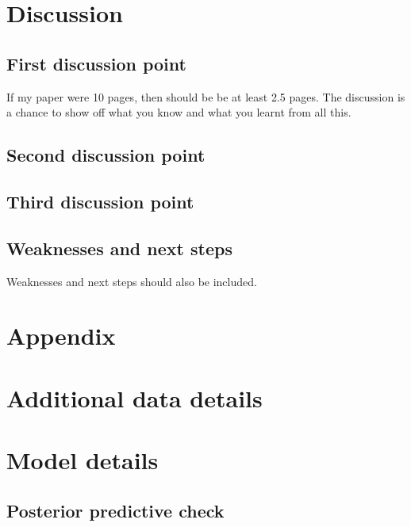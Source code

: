 \documentclass[
  letterpaper,
  DIV=11,
  numbers=noendperiod]{scrartcl}
\begin{document}
\section{Discussion}\label{discussion}

\subsection{First discussion point}\label{sec-first-point}

If my paper were 10 pages, then should be be at least 2.5 pages. The
discussion is a chance to show off what you know and what you learnt
from all this.

\subsection{Second discussion point}\label{second-discussion-point}

\subsection{Third discussion point}\label{third-discussion-point}

\subsection{Weaknesses and next steps}\label{weaknesses-and-next-steps}

Weaknesses and next steps should also be included.

\newpage

\appendix

\section*{Appendix}\label{appendix}

\section{Additional data details}\label{additional-data-details}

\section{Model details}\label{sec-model-details}

\subsection{Posterior predictive
check}\label{posterior-predictive-check}
\end{document}
